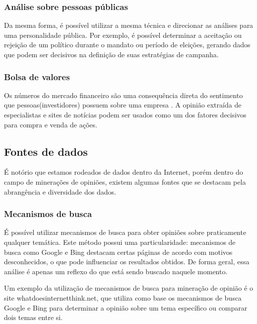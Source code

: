 \subsubsection{Análise sobre pessoas públicas}

Da mesma forma, é possível utilizar a mesma técnica e direcionar as análises para uma personalidade pública. Por exemplo, é possível determinar a aceitação ou rejeição de um político durante o mandato ou período de eleições, gerando dados que podem ser decisivos na definição de suas estratégias de campanha. 

\subsubsection{Bolsa de valores}

Os números do mercado financeiro são uma consequência direta do sentimento que pessoas(investidores) possuem sobre uma empresa \cite{villela2013financcas}. A opinião extraída de especialistas e sites de notícias podem ser usados como um dos fatores decisivos para compra e venda de ações.

\subsection{Fontes de dados}

É notório que estamos rodeados de dados dentro da Internet, porém dentro do campo de minerações de opiniões, existem algumas fontes que se destacam pela abrangência e diversidade dos dados.

\subsubsection{Mecanismos de busca}

É possível utilizar mecanismos de busca para obter opiniões sobre praticamente qualquer temática. Este método possui uma particularidade: mecanismos de busca como Google e Bing destacam certas páginas de acordo com motivos desconhecidos, o que pode influenciar os resultados obtidos. De forma geral, essa análise é apenas um reflexo do que está sendo buscado naquele momento.

Um exemplo da utilização de mecanismos de busca para mineração de opinião é o site whatdoesinternetthink.net\cite{whatdoesinternetthink}, que utiliza como base os mecanismos de busca Google e Bing para determinar a opinião sobre um tema específico ou comparar dois temas entre si.

